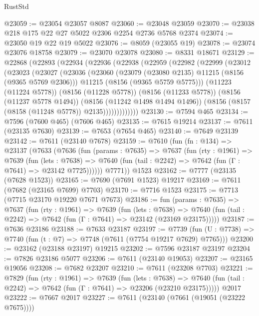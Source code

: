 \begin{lexlean}{RustStd}
\begin{coremodule}
{\begin{coremodule}
{{{{{{{{{{{{{{{{{{{{{{{{{{{{{{{{{{@23059 := @23054 @23057 @8087
@23060 := @23048 @23059
@23070 := @23038 @218 @175 @22 @27 @5022 @2306 @2254 @2736 @5768 @2374
@23074 := @23050 @19 @22 @19 @5022
@23076 := @8059 (@23055 @19)
@23078 := @23074 @23076 @18758
@23079 := @23070 @23078
@23080 := @8331 @18671
@23129 := @22868
    (@22893
      (@22934
        (@22936
          (@22938
            (@22959
              (@22982
                (@22999
                  (@23012
                    (@23023
                      (@23027
                        (@23036
                          (@23060
                            (@23079 (@23080 @2135) @11215 (@8156 (@9365 @5769 @2306)))
                            @11215
                            (@8156 (@9365 @5759 @5775)))
                          (@11223 (@11224 @5778))
                          (@8156 (@11228 @5778))
                          (@8156 (@11233 @5778))
                          (@8156 (@11237 @5778 @1494))
                          (@8156 (@11242 @1498 @1494 @1496))
                          (@8156 (@8157 (@8158 (@11248 @5778)) @2135)))))))))))))
@23130 := @7594 @465
@23134 := @7596 (@7600 @465) (@7606 @465)
@23135 := @7615 @19214
@23137 := @7611 (@23135 @7630)
@23139 := @7653 (@7654 @465)
@23140 := @7649 @23139
@23142 := @7611 (@23140 @7678)
@23159 := @7610
    (fun (fn : @134) =>
    @23137
      (@7633
        (@7636
          (fun (params : @7635) =>
          @7637
            (fun (rty : @1961) =>
            @7639
              (fun (lets : @7638) =>
              @7640 (fun (tail : @2242) => @7642 (fun (Γ : @7641) => @23142 @7725))))))
        @7771))
    @1523
@23162 := @7777 (@23135 (@7628 @1523))
@23165 := @7690 (@7691 @1523) @19217
@23169 := @7611 (@7682 (@23165 @7699) @7703)
@23170 := @7716 @1523
@23175 := @7713 (@7715 @23170 @19220 @7671 @7673)
@23186 := fun (params : @7635) =>
  @7637
    (fun (rty : @1961) =>
    @7639
      (fun (lets : @7638) =>
      @7640 (fun (tail : @2242) => @7642 (fun (Γ : @7641) => @23142 (@23169 @23175)))))
@23187 := @7636 @23186
@23188 := @7633 @23187
@23197 := @7739
    (fun (U : @7738) => @7740 (fun (t : @7) => @7748 (@7611 (@7754 @19217 @7629) @7765)))
@23200 := @23162 (@23188 @23197) @19215
@23202 := @7596 @23187 @23197
@23204 := @7826 @23186 @5077
@23206 := @7611 (@23140 @19053)
@23207 := @23165 @19056
@23208 := @7682 @23207
@23210 := @7611 (@23208 @7703)
@23221 := @7829
    (fun (rty : @1961) =>
    @7639
      (fun (lets : @7638) =>
      @7640 (fun (tail : @2242) => @7642 (fun (Γ : @7641) => @23206 (@23210 @23175)))))
    @2017
@23222 := @7667 @2017
@23227 := @7611 (@23140 (@7661 (@19051 (@23222 @7675))))
}}}}}}}}}}}}}}}}}}}}}}}}}}}}}}}}}}
\end{coremodule}}
\end{coremodule}
\end{lexlean}
